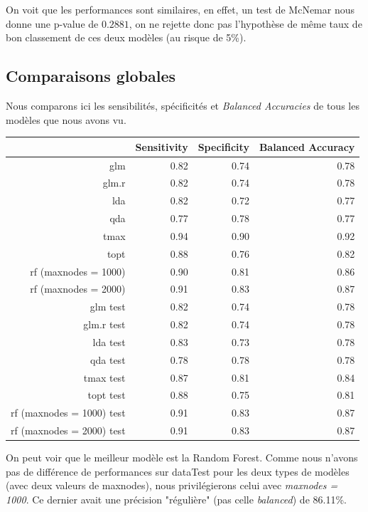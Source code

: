 \documentclass{article}
\begin{document}
On voit que les performances sont similaires, en effet, un test de McNemar nous donne une p-value de $0.2881$, on ne rejette donc pas l'hypothèse de même taux de bon classement de ces deux modèles (au risque de 5\%).

\subsection{Comparaisons globales}

Nous comparons ici les sensibilités, spécificités et \emph{Balanced Accuracies} de tous les modèles que nous avons vu. 

\begin{table}[ht]
    \centering
    \begin{tabular}{|r|rrr|}
        \hline
        & Sensitivity & Specificity & Balanced Accuracy \\ 
        \hline
        glm & 0.82 & 0.74 & 0.78 \\ 
        glm.r & 0.82 & 0.74 & 0.78 \\ 
        lda & 0.82 & 0.72 & 0.77 \\ 
        qda & 0.77 & 0.78 & 0.77 \\ 
        tmax & 0.94 & 0.90 & 0.92 \\ 
        topt & 0.88 & 0.76 & 0.82 \\ 
        rf (maxnodes = 1000) & 0.90 & 0.81 & 0.86 \\ 
        rf (maxnodes = 2000) & 0.91 & 0.83 & 0.87 \\ 
        \hline
        \hline
        glm test & 0.82 & 0.74 & 0.78 \\ 
        glm.r test & 0.82 & 0.74 & 0.78 \\ 
        lda test & 0.83 & 0.73 & 0.78 \\ 
        qda test & 0.78 & 0.78 & 0.78 \\ 
        tmax test & 0.87 & 0.81 & 0.84 \\ 
        topt test & 0.88 & 0.75 & 0.81 \\ 
        rf (maxnodes = 1000) test & 0.91 & 0.83 & 0.87 \\ 
        rf (maxnodes = 2000) test & 0.91 & 0.83 & 0.87 \\ 
        \hline
    \end{tabular}
\end{table}

On peut voir que le meilleur modèle est la Random Forest. Comme nous n'avons pas de différence de performances sur dataTest pour les deux types de modèles (avec deux valeurs de maxnodes), nous privilégierons celui avec \emph{maxnodes = 1000}. Ce dernier avait une précision "régulière" (pas celle \emph{balanced}) de 86.11\%.
\end{document}
